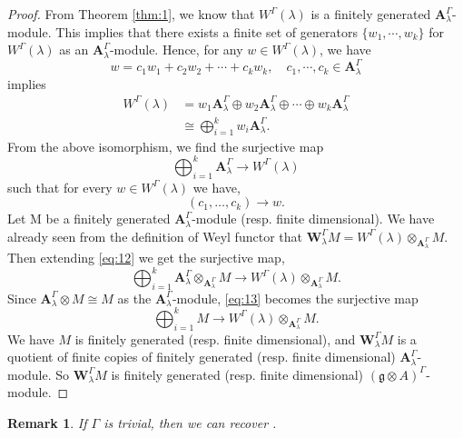 \documentclass[11pt]{amsart}
\theoremstyle{plain}
\newtheorem{rem}[thm]{Remark}
\theoremstyle{definition}
\newcommand{\g}{\mathfrak{g}}
\newcommand{\A}{\mathbf{A}_{\lambda}^{\Gamma}}
\begin{document}
\begin{proof}
From Theorem \ref{thm:1}, we know that $W^{\Gamma}(\lambda)$ is a finitely generated $\A$-module. This implies that there exists a finite set of generators $\{w_{1},\cdots,w_{k}\}$ for $W^{\Gamma}(\lambda)$ as an $\A$-module. Hence, for any $w\in W^{\Gamma}(\lambda)$, we have
\[w =c_{1}w_{1}+c_{2}w_{2}+\cdots+c_{k}w_{k},\quad c_{1},\cdots,c_{k}\in\A\] implies
    \begin{align*}
 W^{\Gamma}(\lambda)&=w_{1}\A\oplus w_{2}\A\oplus\cdots\oplus w_{k}\A\\
&\cong\bigoplus_{i=1}^{k}w_{i}\A.
    \end{align*}
From the above isomorphism, we find the surjective map
    \begin{equation}\label{eq:12}
        \bigoplus_{i=1}^{k}\A\rightarrow W^{\Gamma}(\lambda)
    \end{equation}
such that for every $w\in W^{\Gamma}(\lambda)$ we have,
\begin{equation*}
        (c_{1},\ldots, c_{k})\rightarrow w.
    \end{equation*}
Let M be a finitely generated $\A$-module (resp. finite dimensional). We have already seen from the definition of Weyl functor that 
$\mathbf{W}_{\lambda}^{\Gamma}M=W^{\Gamma}(\lambda)\otimes_{\A} M$. Then extending \eqref{eq:12} we get the surjective map,
\begin{equation}\label{eq:13}
       \bigoplus_{i=1}^{k}\A\otimes_{\A} M\rightarrow W^{\Gamma}(\lambda)\otimes_{\A} M.
   \end{equation}
Since $\A\otimes M\cong M$ as the $\A$-module, \eqref{eq:13} becomes the surjective map
\begin{equation*}
       \bigoplus_{i=1}^{k}M\rightarrow W^{\Gamma}(\lambda)\otimes_{\A} M.
\end{equation*}
We have $M$ is finitely generated (resp. finite dimensional), and $\mathbf{W}_{\lambda}^{\Gamma}M$ is a quotient of finite copies of finitely generated (resp. finite dimensional) $\A$-module. So $\mathbf{W}_{\lambda}^{\Gamma}M$ is finitely generated (resp. finite dimensional) $(\g\otimes A)^{\Gamma}$-module.
\end{proof}
\begin{rem}\label{rem:1}
If $\Gamma$ is trivial, then we can recover \cite[Corollary 7.10]{BCM19}.
\end{rem}
\end{document}
